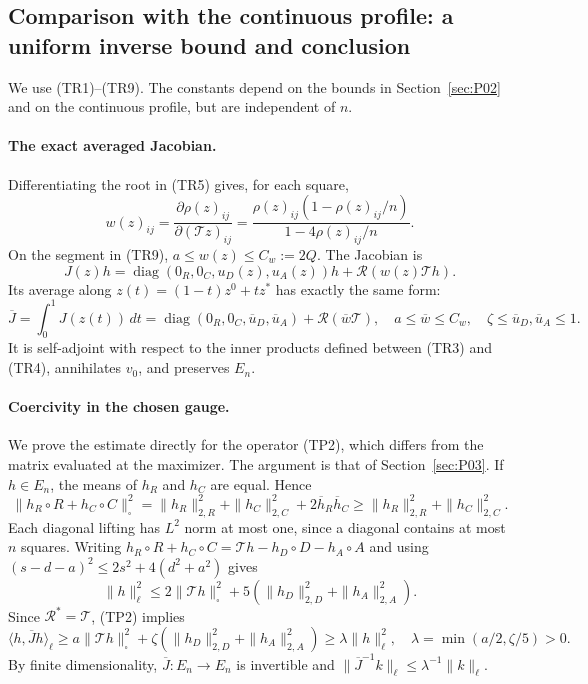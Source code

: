 \subsection{Comparison with the continuous profile: a uniform inverse bound and conclusion}\label{sec:P06}
We use (TR1)--(TR9). The constants depend on the bounds in Section~\ref{sec:P02} and
on the continuous profile, but are independent of $n$.

\paragraph{The exact averaged Jacobian.}
Differentiating the root in (TR5) gives, for each square,
\[
 w(z)_{ij}=\frac{\partial\rho(z)_{ij}}{\partial(\mathcal Tz)_{ij}}
 =\frac{\rho(z)_{ij}(1-\rho(z)_{ij}/n)}{1-4\rho(z)_{ij}/n}.
\]
On the segment in (TR9), $a\le w(z)\le C_w:=2Q$. The Jacobian is
\[
 J(z)h=\operatorname{diag}(0_R,0_C,u_D(z),u_A(z))h
                         +\mathcal R(w(z)\mathcal T h).
                                                        \tag{TP1}
\]
Its average along $z(t)=(1-t)z^0+tz^*$ has exactly the same form:
\[
 \overline J=\int_0^1J(z(t))\,dt
 =\operatorname{diag}(0_R,0_C,\overline u_D,\overline u_A)
                              +\mathcal R(\overline w\mathcal T),
 \quad a\le\overline w\le C_w,\quad\zeta\le\overline u_D,\overline u_A\le1.
                                                        \tag{TP2}
\]
It is self-adjoint with respect to the inner products defined between (TR3) and (TR4), annihilates $v_0$,
and
preserves $E_n$.

\paragraph{Coercivity in the chosen gauge.}
We prove the estimate directly for the operator (TP2), which differs from the matrix evaluated at the
maximizer. The argument is that of Section~\ref{sec:P03}.
If $h\in E_n$, the means of $h_R$ and $h_C$ are equal. Hence
\[
 \|h_R\circ R+h_C\circ C\|_\square^2
 =\|h_R\|_{2,R}^2+\|h_C\|_{2,C}^2+2\overline h_R\overline h_C
 \ge\|h_R\|_{2,R}^2+\|h_C\|_{2,C}^2.
\]
Each diagonal lifting has $L^2$ norm at most one, since
a diagonal contains at most $n$ squares. Writing
$h_R\circ R+h_C\circ C=\mathcal T h-h_D\circ D-h_A\circ A$
and using $(s-d-a)^2\le2s^2+4(d^2+a^2)$ gives
\[
 \|h\|_\ell^2\le2\|\mathcal T h\|_\square^2
                    +5(\|h_D\|_{2,D}^2+\|h_A\|_{2,A}^2).
\]
Since $\mathcal R^*=\mathcal T$, (TP2) implies
\[
 \langle h,\overline Jh\rangle_\ell
 \ge a\|\mathcal T h\|_\square^2
             +\zeta(\|h_D\|_{2,D}^2+\|h_A\|_{2,A}^2)
 \ge\lambda\|h\|_\ell^2,
 \quad\lambda=\min(a/2,\zeta/5)>0.
                                                        \tag{TP3}
\]
By finite dimensionality, $\overline J:E_n\to E_n$ is invertible and
$\|\overline J^{-1}k\|_\ell\le\lambda^{-1}\|k\|_\ell$.

